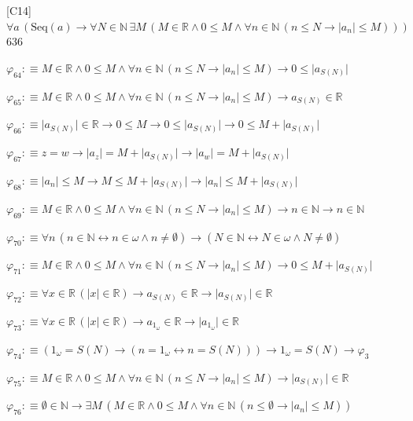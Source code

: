 \begin{fullproof}{[C14]}{$\forall a\,(\mathrm{Seq}(a) \to \forall N \in \mathbb{N}\,\exists M\,(M \in \mathbb{R} \land 0 \leq M \land \forall n \in \mathbb{N}\,(n \leq N \to \lvert a_{n} \rvert \leq M)))$}{636}
\begin{abbrevlist}
\item $\varphi_{64} :\equiv M \in \mathbb{R} \land 0 \leq M \land \forall n \in \mathbb{N}\,(n \leq N \to \lvert a_{n} \rvert \leq M) \to 0 \leq \lvert a_{S(N)} \rvert$
\item $\varphi_{65} :\equiv M \in \mathbb{R} \land 0 \leq M \land \forall n \in \mathbb{N}\,(n \leq N \to \lvert a_{n} \rvert \leq M) \to a_{S(N)} \in \mathbb{R}$
\item $\varphi_{66} :\equiv \lvert a_{S(N)} \rvert \in \mathbb{R} \to 0 \leq M \to 0 \leq \lvert a_{S(N)} \rvert \to 0 \leq M + \lvert a_{S(N)} \rvert$
\item $\varphi_{67} :\equiv z = w \to \lvert a_{z} \rvert = M + \lvert a_{S(N)} \rvert \to \lvert a_{w} \rvert = M + \lvert a_{S(N)} \rvert$
\item $\varphi_{68} :\equiv \lvert a_{n} \rvert \leq M \to M \leq M + \lvert a_{S(N)} \rvert \to \lvert a_{n} \rvert \leq M + \lvert a_{S(N)} \rvert$
\item $\varphi_{69} :\equiv M \in \mathbb{R} \land 0 \leq M \land \forall n \in \mathbb{N}\,(n \leq N \to \lvert a_{n} \rvert \leq M) \to n \in \mathbb{N} \to n \in \mathbb{N}$
\item $\varphi_{70} :\equiv \forall n\,(n \in \mathbb{N} \leftrightarrow n \in \omega \land n \neq \emptyset) \to (N \in \mathbb{N} \leftrightarrow N \in \omega \land N \neq \emptyset)$
\item $\varphi_{71} :\equiv M \in \mathbb{R} \land 0 \leq M \land \forall n \in \mathbb{N}\,(n \leq N \to \lvert a_{n} \rvert \leq M) \to 0 \leq M + \lvert a_{S(N)} \rvert$
\item $\varphi_{72} :\equiv \forall x \in \mathbb{R}\,(\lvert x \rvert \in \mathbb{R}) \to a_{S(N)} \in \mathbb{R} \to \lvert a_{S(N)} \rvert \in \mathbb{R}$
\item $\varphi_{73} :\equiv \forall x \in \mathbb{R}\,(\lvert x \rvert \in \mathbb{R}) \to a_{1_{\omega}} \in \mathbb{R} \to \lvert a_{1_{\omega}} \rvert \in \mathbb{R}$
\item $\varphi_{74} :\equiv (1_{\omega} = S(N) \to (n = 1_{\omega} \leftrightarrow n = S(N))) \to 1_{\omega} = S(N) \to \varphi_{3}$
\item $\varphi_{75} :\equiv M \in \mathbb{R} \land 0 \leq M \land \forall n \in \mathbb{N}\,(n \leq N \to \lvert a_{n} \rvert \leq M) \to \lvert a_{S(N)} \rvert \in \mathbb{R}$
\item $\varphi_{76} :\equiv \emptyset \in \mathbb{N} \to \exists M\,(M \in \mathbb{R} \land 0 \leq M \land \forall n \in \mathbb{N}\,(n \leq \emptyset \to \lvert a_{n} \rvert \leq M))$

\end{abbrevlist}
\end{fullproof}
